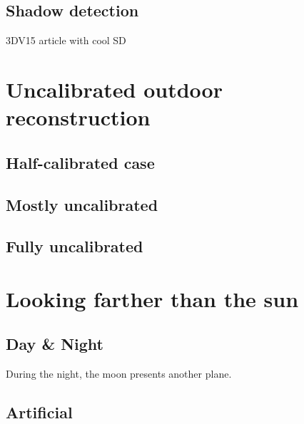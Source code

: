 \documentclass{report}
\begin{document}

\subsection{Shadow detection}
3DV15 article with cool SD

\section{Uncalibrated outdoor reconstruction}
\label{sec:uncalib}



\subsection{Half-calibrated case}


\subsection{Mostly uncalibrated}


\subsection{Fully uncalibrated}

\section{Looking farther than the sun}


\subsection{Day \& Night}
During the night, the moon presents another plane.



\subsection{Artificial}
\end{document}
